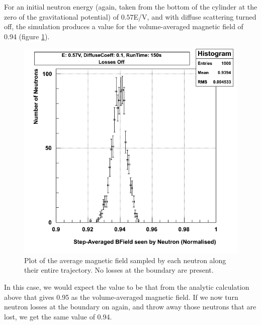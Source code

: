 \documentclass[11pt,a4paper,oneside]{article}
\begin{document}
For an initial neutron energy (again, taken from the bottom of the cylinder at the zero of the gravitational potential) of $0.57$E/V, and with diffuse scattering turned off, the simulation produces a value for the volume-averaged magnetic field of 0.94 (figure \ref{fig:avgmagfieldnolosses}).

\begin{figure}[!htbp] 	
\begin{center}
\includegraphics[scale=0.5]{figures/magfield-0_01Diff-lossesoff}
\end{center}
\caption{Plot of the average magnetic field sampled by each neutron along their entire trajectory. No losses at the boundary are present.}
\label{fig:avgmagfieldnolosses}
\end{figure}

In this case, we would expect the value to be that from the analytic calculation above that gives 0.95 as the volume-averaged magnetic field. If we now turn neutron losses at the boundary on again, and throw away those neutrons that are lost, we get the same value of 0.94.
\end{document}
